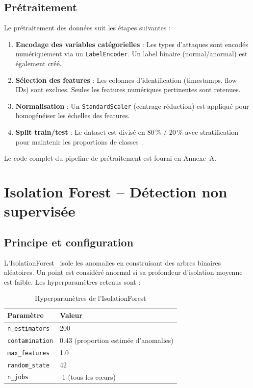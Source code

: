\subsection{Prétraitement}

Le prétraitement des données suit les étapes suivantes :
\begin{enumerate}
  \item \textbf{Encodage des variables catégorielles} : Les types d'attaques sont encodés numériquement via un \texttt{LabelEncoder}. Un label binaire (normal/anormal) est également créé.
  \item \textbf{Sélection des features} : Les colonnes d'identification (timestamps, flow IDs) sont exclues. Seules les features numériques pertinentes sont retenues.
  \item \textbf{Normalisation} : Un \texttt{StandardScaler} (centrage-réduction) est appliqué pour homogénéiser les échelles des features.
  \item \textbf{Split train/test} : Le dataset est divisé en 80\,\% / 20\,\% avec stratification pour maintenir les proportions de classes~\cite{scikit_learn}.
\end{enumerate}

Le code complet du pipeline de prétraitement est fourni en Annexe~A.

\section{Isolation Forest -- Détection non supervisée}

\subsection{Principe et configuration}

L'IsolationForest~\cite{liu2008isolation} isole les anomalies en construisant des arbres binaires aléatoires. Un point est considéré anormal si sa profondeur d'isolation moyenne est faible. Les hyperparamètres retenus sont :

\begin{table}[H]
\centering
\caption{Hyperparamètres de l'IsolationForest}
\label{tab:iso_params}
\begin{tabular}{ll}
\toprule
\textbf{Paramètre} & \textbf{Valeur} \\
\midrule
\texttt{n\_estimators} & 200 \\
\texttt{contamination} & 0.43 (proportion estimée d'anomalies) \\
\texttt{max\_features} & 1.0 \\
\texttt{random\_state} & 42 \\
\texttt{n\_jobs} & -1 (tous les cœurs) \\
\bottomrule
\end{tabular}
\end{table}

